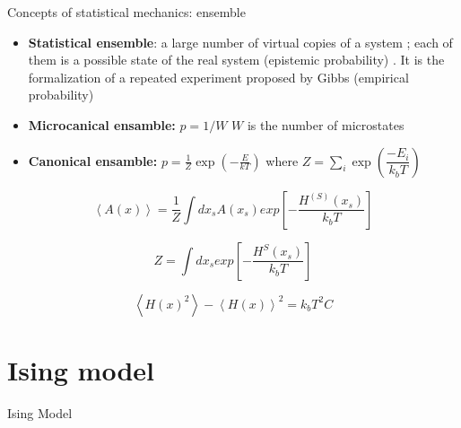 \documentclass{beamer}
\begin{document}
\begin{frame}{Concepts of statistical mechanics: ensemble \cite{peliti2011statistical}}

\begin{itemize}
\item \textbf{Statistical ensemble}: a large number of virtual copies of a system ; each of them  is a possible state of the real system (epistemic probability) . It is the formalization of a repeated experiment proposed by Gibbs (empirical probability)
\item\textbf{ Microcanical ensamble:} $p=1/W$ $W$ is the number of microstates
\item \textbf{Canonical ensamble:} $p=\frac{1}{Z}\exp\left(-\frac{E}{kT}\right)$ where $Z=\sum_{i}\exp\left(\dfrac{-E_{i}}{k_{b}T}\right)$
\end{itemize}
\begin{equation}
\left\langle A(x) \right\rangle=\dfrac{1}{Z}\int dx_{s}A(x_{s})exp\left[ -\frac{H^{(S)}(x_{s})}{k_{b}T} \right]
\end{equation}

\begin{equation}
Z=\int dx_{s}exp\left[  -\frac{H^{S}(x_{s})}{k_{b}T}  \right]
\end{equation}

\begin{equation}
\left\langle H(x)^{2} \right\rangle-\left\langle H(x) \right\rangle^{2}=k_{b}T^{2}C
\end{equation}


\end{frame}





\section{Ising model}

\begin{frame}{}
\begin{center}
{\Huge Ising Model}
\end{center}
\end{frame}
\end{document}
